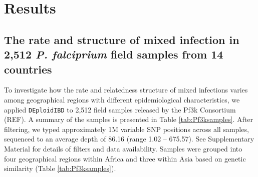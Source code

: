 \documentclass[9pt,lineno]{elife}
\begin{document}
\section{Results}

\subsection{The rate and structure of mixed infection in 2,512 {\it P. falciprium} field samples from 14 countries}

To investigate how the rate and relatedness structure of mixed infections varies among geographical regions with different epidemiological characteristics, we applied \texttt{DEploidIBD} to 2,512 field samples released by the Pf3k Consortium (REF).  A summary of the samples is presented in Table \ref{tab:Pf3ksamples}.  After filtering, we typed approximately 1M variable SNP positions across all samples, sequenced to an average depth of 86.16 (range 1.02 – 675.57).  See Supplementary Material for details of filters and data availability.  Samples were grouped into four geographical regions within Africa and three within Asia based on genetic similarity (Table \ref{tab:Pf3ksamples}).
\end{document}
